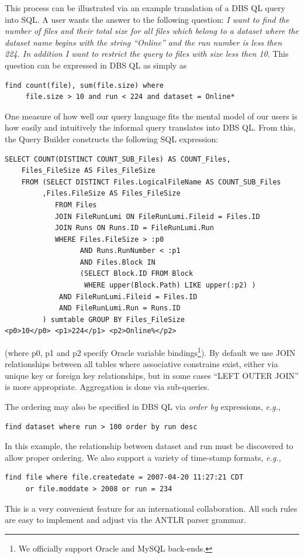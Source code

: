 \documentclass[a4paper]{jpconf}
\begin{document}
This process can be illustrated via an example translation of a
DBS QL query into SQL.  A user wants the answer to the following
question: {\it I want to find the number of files and their total
size for all files which belong to a dataset where the dataset name begins with
the string ``Online''
and the run number is less then 224. In addition I want to restrict the query
to files with size less then 10}. This question can be
expressed in DBS QL as simply as
\begin{verbatim}
find count(file), sum(file.size) where 
     file.size > 10 and run < 224 and dataset = Online*
\end{verbatim}
One measure of how well our query language fits the mental model of our users is
how easily and intuitively the informal query translates into DBS QL.
From this, the Query Builder constructs the following SQL expression:
\begin{verbatim}
SELECT COUNT(DISTINCT COUNT_SUB_Files) AS COUNT_Files, 
    Files_FileSize AS Files_FileSize  
    FROM (SELECT DISTINCT Files.LogicalFileName AS COUNT_SUB_Files
         ,Files.FileSize AS Files_FileSize
            FROM Files
            JOIN FileRunLumi ON FileRunLumi.Fileid = Files.ID
            JOIN Runs ON Runs.ID = FileRunLumi.Run
            WHERE Files.FileSize > :p0 
                  AND Runs.RunNumber < :p1
                  AND Files.Block IN 
                  (SELECT Block.ID FROM Block 
                   WHERE upper(Block.Path) LIKE upper(:p2) )
             AND FileRunLumi.Fileid = Files.ID
             AND FileRunLumi.Run = Runs.ID
         ) sumtable GROUP BY Files_FileSize
<p0>10</p0> <p1>224</p1> <p2>Online%</p2>
\end{verbatim}
(where p0, p1 and p2 specify Oracle variable bindings\footnote{We officially support Oracle and
MySQL back-ends.}).
By default we use JOIN relationships between all tables where associative
constrains exist, either via unique key or foreign key relationships,
but in some cases ``LEFT OUTER JOIN'' is more appropriate.
Aggregation is done via sub-queries.

The ordering may also be specified in DBS QL via {\it order by}
expressions, {\it e.g.,}
\begin{verbatim}
find dataset where run > 100 order by run desc
\end{verbatim}
In this example, the relationship between dataset and run
must be discovered to allow proper ordering.
We also support a variety of time-stamp formats, {\it e.g.,}
\begin{verbatim}
find file where file.createdate = 2007-04-20 11:27:21 CDT 
     or file.moddate > 2008 or run = 234
\end{verbatim}
This is a very convenient feature for an international collaboration.
All such rules are easy to implement and adjust via the ANTLR parser grammar.
\end{document}
